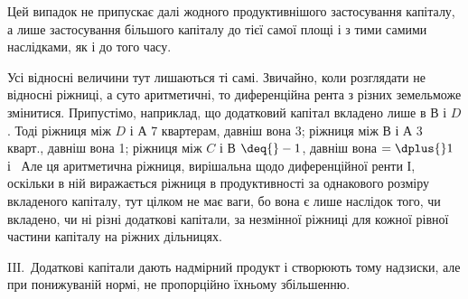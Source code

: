 
Цей випадок не припускає далі жодного продуктивнішого застосування
капіталу, а лише застосування більшого капіталу до тієї самої площі і з тими
самими наслідками, як і до того часу.

Усі відносні величини тут лишаються ті самі. Звичайно, коли розглядати
не відносні ріжниці, а суто аритметичні, то диференційна рента з різних земельможе
змінитися. Припустімо, наприклад, що додатковий капітал вкладено лише
в $В$ і $D$. Тоді ріжниця між $D$ і $А$ \deq{} 7 квартерам, давніш вона \deq{} 3; ріжниця
між $В$ і $А$ \deq{} 3 кварт., давніш вона \deq{} 1; ріжниця між $C$ і В $\deq{} - 1$, давніш
вона $= \dplus{} 1$ і~ Але ця аритметична ріжниця, вирішальна щодо диференційної
ренти І, оскільки в ній виражається ріжниця в продуктивності за однакового
розміру вкладеного капіталу, тут цілком не має ваги, бо вона є лише
наслідок того, чи вкладено, чи ні різні додаткові капітали, за незмінної ріжниці
для кожної рівної частини капіталу на ріжних дільницях.

IIІ.~Додаткові капітали дають надмірний продукт і створюють тому надзиски,
але при понижуваній нормі, не пропорційно їхньому збільшенню.

